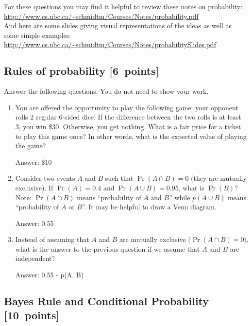 \documentclass{article}
\newcommand{\blu}[1]{{\textcolor{blu}{#1}}}
\newenvironment{answer}{\par\begingroup\color{gre}Answer: }{\endgroup}
\let\ask\blu
\newcommand\pts[1]{\textcolor{pointscolour}{[#1~points]}}
\begin{document}
  For these questions you may find it helpful to review these notes on probability:\\
  \url{http://www.cs.ubc.ca/~schmidtm/Courses/Notes/probability.pdf}\\
  And here are some slides giving visual representations of the ideas as well as some simple examples:\\
  \url{http://www.cs.ubc.ca/~schmidtm/Courses/Notes/probabilitySlides.pdf}

  \subsection{Rules of probability \pts{6}}

  \ask{Answer the following questions.} You do not need to show your work.

  \begin{enumerate}
  \item You are offered the opportunity to play the following game: your opponent rolls 2 regular 6-sided dice. If the difference between the two rolls is at least 3, you win \$30. Otherwise, you get nothing. What is a fair price for a ticket to play this game once? In other words, what is the expected value of playing the game?
  \begin{answer}
  \$10
  \end{answer}
  \item Consider two events $A$ and $B$ such that $\Pr(A \cap B)=0$ (they are mutually exclusive). If $\Pr(A) = 0.4$ and $\Pr(A \cup B) = 0.95$, what is $\Pr(B)$? Note: $\Pr(A \cap B)$ means
  ``probability of $A$ and $B$'' while $p(A \cup B)$ means ``probability of $A$ or $B$''. It may be helpful to draw a Venn diagram.
  \begin{answer}
  0.55
  \end{answer}
  \item Instead of assuming that $A$ and $B$ are mutually exclusive ($\Pr(A \cap B) = 0)$, what is the answer to the previous question if we assume that $A$ and $B$ are independent?
  \begin{answer}
  0.55 - p(A, B)
  \end{answer}


  \end{enumerate}

  \subsection{Bayes Rule and Conditional Probability \pts{10}}
\end{document}
